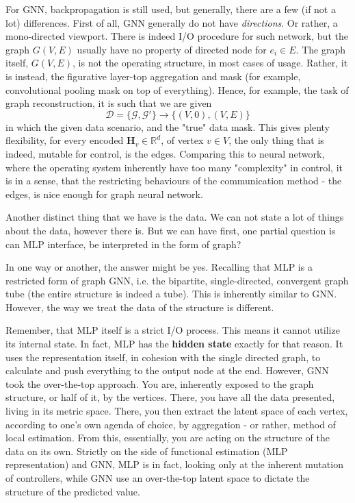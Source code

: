 \documentclass[twoside,10pt]{article}
\begin{document}
For GNN, backpropagation is still used, but generally, there are a few (if not a lot) differences. First of all, GNN generally do not have \textit{directions}. Or rather, a mono-directed viewport. There is indeed I/O procedure for such network, but the graph $G(V,E)$ usually have no property of directed node for $e_{i}\in E$. The graph itself, $G(V,E)$, is not the operating structure, in most cases of usage. Rather, it is instead, the figurative layer-top aggregation and mask (for example, convolutional pooling mask on top of everything). Hence, for example, the task of graph reconstruction, it is such that we are given $$\mathcal{D}=\{ \mathcal{G},\mathcal{G}' \}\to \{ (V,0) , (V,E) \}$$
in which the given data scenario, and the "true" data mask. This gives plenty flexibility, for every encoded $\mathbf{H}_{v}\in \mathbb{R}^{d}$, of vertex $v\in V$, the only thing that is indeed, mutable for control, is the edges. Comparing this to neural network, where the operating system inherently have too many "complexity" in control, it is in a sense, that the restricting behaviours of the communication method - the edges, is nice enough for graph neural network. 


Another distinct thing that we have is the data. We can not state a lot of things about the data, however there is. But we can have first, one partial question is can MLP interface, be interpreted in the form of graph? 

In one way or another, the answer might be yes. Recalling that MLP is a restricted form of graph GNN, i.e. the bipartite, single-directed, convergent graph tube (the entire structure is indeed a tube). This is inherently similar to GNN. However, the way we treat the data of the structure is different. 

Remember, that MLP itself is a strict I/O process. This means it cannot utilize its internal state. In fact, MLP has the \textbf{hidden state} exactly for that reason. It uses the representation itself, in cohesion with the single directed graph, to calculate and push everything to the output node at the end. However, GNN took the over-the-top approach. You are, inherently exposed to the graph structure, or half of it, by the vertices. There, you have all the data presented, living in its metric space. There, you then extract the latent space of each vertex, according to one's own agenda of choice, by aggregation - or rather, method of local estimation. From this, essentially, you are acting on the structure of the data on its own. Strictly on the side of functional estimation (MLP representation) and GNN, MLP is in fact, looking only at the inherent mutation of controllers, while GNN use an over-the-top latent space to dictate the structure of the predicted value. 
\end{document}
